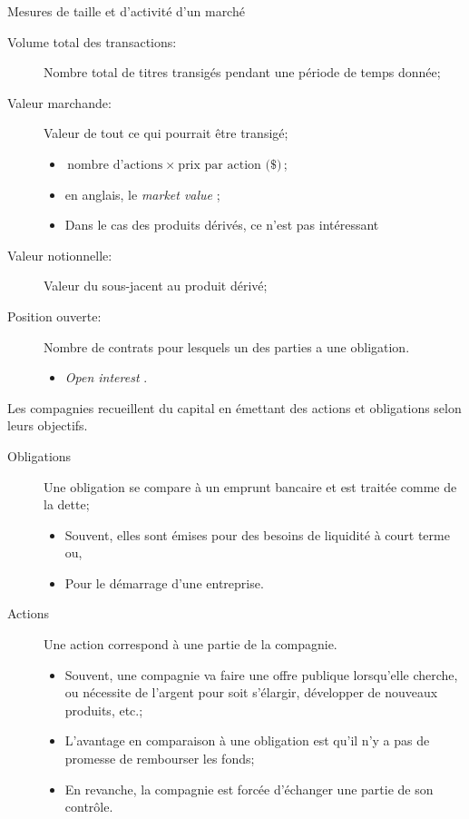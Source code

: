 \documentclass[10pt, french]{article}
\begin{document}
\begin{multicols*}{2}
\begin{conceptgen}{Mesures de taille et d'activité d'un marché}
\begin{description}
	\item[Volume total des transactions:] Nombre total de titres transigés pendant une période de temps donnée;
	\item[Valeur marchande:] Valeur de tout ce qui pourrait être transigé;
		\begin{itemize}[leftmargin = *]
		\item	$\text{nombre d'actions} \ \times \ \text{prix par action (\$)}$;
		\item	en anglais, le \og \textit{market value} \fg{};
		\item	Dans le cas des produits dérivés, ce n'est pas intéressant
		\end{itemize}
\tcbline
	\item[Valeur notionnelle:] Valeur du sous-jacent au produit dérivé;
	\item[Position ouverte:] Nombre de contrats pour lesquels un des parties a une obligation. 
		\begin{itemize}[leftmargin = *]
		\item	\og \textit{Open interest} \fg{}.
		\end{itemize}
\end{description}
\end{conceptgen}

Les compagnies recueillent du capital en émettant des actions et obligations selon leurs objectifs. 
\begin{description}
	\item[Obligations]	Une obligation se compare à un emprunt bancaire et est traitée comme de la dette;
		\begin{itemize}[leftmargin = *]
		\item	Souvent, elles sont émises pour des besoins de liquidité à court terme ou,
		\item	Pour le démarrage d'une entreprise.
		\end{itemize}
	\item[Actions]	Une action correspond à une partie de la compagnie.
		\begin{itemize}[leftmargin = *]
		\item	Souvent, une compagnie va faire une offre publique lorsqu'elle cherche, ou nécessite de l'argent pour soit s'élargir, développer de nouveaux produits, etc.;
		\item	L'avantage en comparaison à une obligation est qu'il n'y a pas de promesse de rembourser les fonds;
		\item	En revanche, la compagnie est forcée d'échanger une partie de son contrôle.
		\end{itemize}
\end{description}


\end{multicols*}
\end{document}
